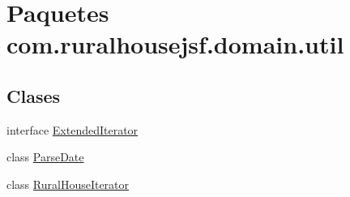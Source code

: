 \hypertarget{namespacecom_1_1ruralhousejsf_1_1domain_1_1util}{}\section{Paquetes com.\+ruralhousejsf.\+domain.\+util}
\label{namespacecom_1_1ruralhousejsf_1_1domain_1_1util}
\subsection*{Clases}
\begin{DoxyCompactItemize}
\item 
interface \mbox{\hyperlink{interfacecom_1_1ruralhousejsf_1_1domain_1_1util_1_1_extended_iterator}{Extended\+Iterator}}
\item 
class \mbox{\hyperlink{classcom_1_1ruralhousejsf_1_1domain_1_1util_1_1_parse_date}{Parse\+Date}}
\item 
class \mbox{\hyperlink{classcom_1_1ruralhousejsf_1_1domain_1_1util_1_1_rural_house_iterator}{Rural\+House\+Iterator}}
\end{DoxyCompactItemize}
